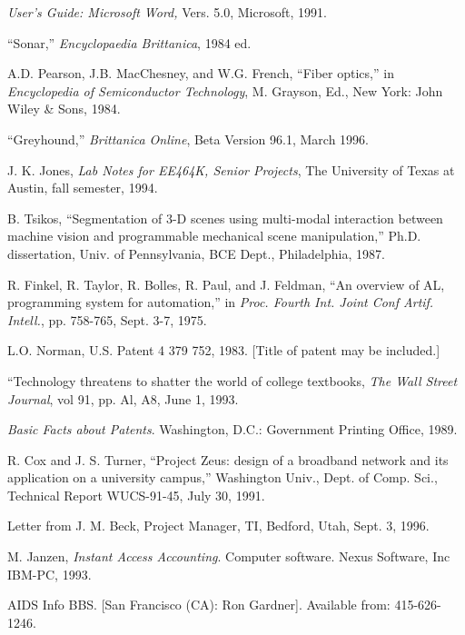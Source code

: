 \begin{thebibliography}{1}
\emph{User’s Guide: Microsoft Word,} Vers. 5.0, Microsoft, 1991.


“Sonar,” \emph{Encyclopaedia Brittanica}, 1984 ed.

A.D. Pearson, J.B. MacChesney, and W.G. French, “Fiber optics,” in \emph{Encyclopedia of Semiconductor Technology}, M. Grayson, Ed., New York: John Wiley \& Sons, 1984.

“Greyhound,” \emph{Brittanica Online}, Beta Version 96.1, March 1996.

J. K. Jones, \emph{Lab Notes for EE464K, Senior Projects}, The University of Texas at Austin, fall semester, 1994.

B. Tsikos, “Segmentation of 3-D scenes using multi-modal interaction between machine vision and programmable mechanical scene manipulation,” Ph.D.
dissertation, Univ. of Pennsylvania, BCE Dept., Philadelphia, 1987.

R. Finkel, R. Taylor, R. Bolles, R. Paul, and J. Feldman, “An overview of AL, programming system for automation,” in \emph{Proc. Fourth Int. Joint Conf Artif. Intell.}, pp. 758-765, Sept. 3-7, 1975.

L.O. Norman, U.S. Patent 4 379 752, 1983. [Title of patent may be included.]

“Technology threatens to shatter the world of college textbooks, \emph{The Wall Street Journal}, vol 91, pp. Al, A8, June 1, 1993.

\emph{Basic Facts about Patents}. Washington, D.C.: Government Printing Office, 1989.

R. Cox and J. S. Turner, “Project Zeus: design of a broadband network and its
application on a university campus,” Washington Univ., Dept. of Comp. Sci.,
Technical Report WUCS-91-45, July 30, 1991.


Letter from J. M. Beck, Project Manager, TI, Bedford, Utah, Sept. 3, 1996.

M. Janzen, \emph{Instant Access Accounting}. Computer software. Nexus Software, Inc IBM-PC, 1993.


AIDS Info BBS. [San Francisco (CA): Ron Gardner]. Available from: 415-626-1246.


\end{thebibliography}
